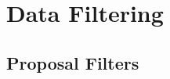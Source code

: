%
%
%
%



\clearpage
\newpage
\section{Data Filtering}\label{secA:DataFilter}
    \subsection{  Proposal Filters}\label{secA:DataFilter_proposal}

